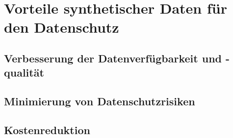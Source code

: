 \documentclass[../main.tex]{subfiles}
\begin{document}
\chapter{Vorteile synthetischer Daten für den Datenschutz}
\section{Verbesserung der Datenverfügbarkeit und -qualität}
\section{Minimierung von Datenschutzrisiken}
\section{Kostenreduktion}
\end{document}
